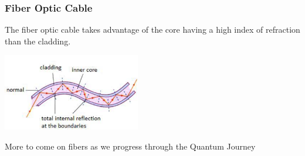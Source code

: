 \documentclass{beamer}
\begin{document}
\begin{frame}\frametitle{Fiber Optic Cable}
The fiber optic cable takes advantage of the core having a high index of refraction than the cladding.

\begin{center}
\includegraphics[width=6cm]{fig/cladding.jpg}
\end{center}

\vspace{3cm}

More to come on fibers as we progress through the Quantum Journey


\end{frame}
\end{document}

